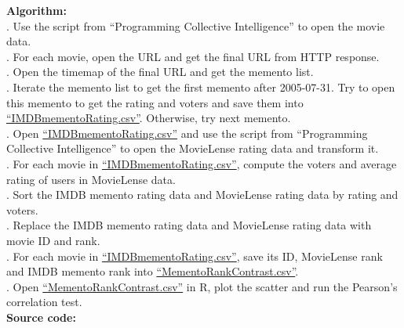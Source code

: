 \documentclass{article}
\begin{document}
		\noindent\textbf{Algorithm:}\\
		. Use the script from ``Programming Collective Intelligence'' to open the movie data.\\
		. For each movie, open the URL and get the final URL from HTTP response.\\
		. Open the timemap of the final URL and get the memento list.\\
		. Iterate the memento list to get the first memento after 2005-07-31. Try to open this memento to get the rating and voters and save them into \href{https://github.com/zhangboroy/cs532-s17/blob/master/assg07_submission/IMDBmementoRating.csv}{``IMDBmementoRating.csv''}. Otherwise, try next memento.\\
		. Open \href{https://github.com/zhangboroy/cs532-s17/blob/master/assg07_submission/IMDBmementoRating.csv}{``IMDBmementoRating.csv''} and use the script from ``Programming Collective Intelligence'' to open the MovieLense rating data and transform it.\\
		. For each movie in \href{https://github.com/zhangboroy/cs532-s17/blob/master/assg07_submission/IMDBmementoRating.csv}{``IMDBmementoRating.csv''}, compute the voters and average rating of users in MovieLense data.\\
		. Sort the IMDB memento rating data and MovieLense rating data by rating and voters.\\
		. Replace the IMDB memento rating data and MovieLense rating data with movie ID and rank.\\
		. For each movie in \href{https://github.com/zhangboroy/cs532-s17/blob/master/assg07_submission/IMDBmementoRating.csv}{``IMDBmementoRating.csv''}, save its ID, MovieLense rank and IMDB memento rank into \href{https://github.com/zhangboroy/cs532-s17/blob/master/assg07_submission/MementoRankContrast.csv}{``MementoRankContrast.csv''}.\\
		. Open \href{https://github.com/zhangboroy/cs532-s17/blob/master/assg07_submission/MementoRankContrast.csv}{``MementoRankContrast.csv''} in R, plot the scatter and run the Pearson's correlation test.\\

		\noindent\textbf{Source code:}
		
		
		
		
\end{document}
